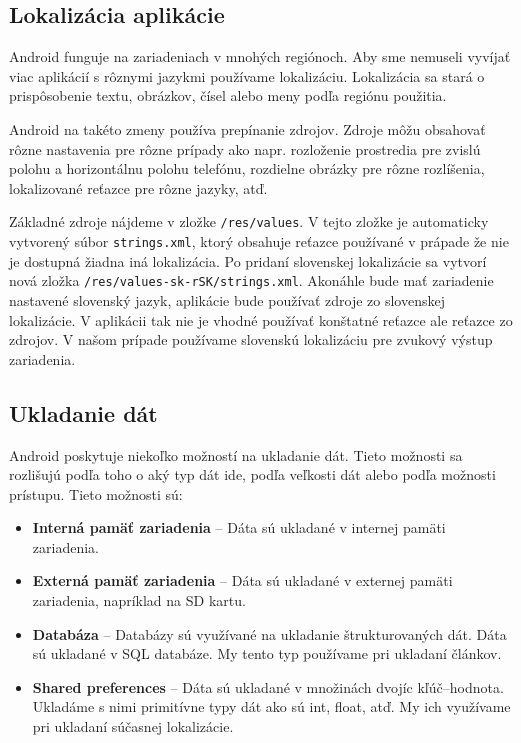 \documentclass{template/socthesis}
\begin{document}
\subsection*{Lokalizácia aplikácie}
Android funguje na zariadeniach v mnohých regiónoch. Aby sme nemuseli vyvíjať viac aplikácií s rôznymi jazykmi používame lokalizáciu. Lokalizácia sa stará o prispôsobenie textu, obrázkov, čísel alebo meny podľa regiónu použitia. 

Android na takéto zmeny používa prepínanie zdrojov. Zdroje môžu obsahovať rôzne nastavenia pre rôzne prípady ako napr. rozloženie prostredia pre zvislú polohu a horizontálnu polohu telefónu, rozdielne obrázky pre rôzne rozlíšenia, lokalizované reťazce pre rôzne jazyky, atď.

Základné zdroje nájdeme v zložke \texttt{/res/values}. V tejto zložke je automaticky vytvorený súbor \texttt{strings.xml}, ktorý obsahuje reťazce používané v prápade že nie je dostupná žiadna iná lokalizácia. Po pridaní slovenskej lokalizácie sa vytvorí nová zložka \texttt{/res/values-sk-rSK/strings.xml}. Akonáhle bude mať zariadenie nastavené slovenský jazyk, aplikácie bude používať zdroje zo slovenskej lokalizácie. V aplikácii tak nie je vhodné používať konštatné reťazce ale reťazce zo zdrojov. V našom prípade používame slovenskú lokalizáciu pre zvukový výstup zariadenia.

\subsection*{Ukladanie dát}
Android poskytuje niekoľko možností na ukladanie dát. Tieto možnosti sa rozlišujú podľa toho o aký typ dát ide, podľa veľkosti dát alebo podľa možnosti prístupu. Tieto možnosti sú\cite{persistence}:
\begin{itemize}
	\item \textbf{Interná pamäť zariadenia} -- Dáta sú ukladané v internej pamäti zariadenia.
	\item \textbf{Externá pamäť zariadenia} -- Dáta sú ukladané v externej pamäti zariadenia, napríklad na SD kartu.
	\item \textbf{Databáza} -- Databázy sú využívané na ukladanie štrukturovaných dát. Dáta sú ukladané v SQL databáze. My tento typ používame pri ukladaní článkov.
	\item \textbf{Shared preferences} -- Dáta sú ukladané v množinách dvojíc kľúč–hodnota. Ukladáme s nimi primitívne typy dát ako sú int, float, atď. My ich využívame pri ukladaní súčasnej lokalizácie.
\end{itemize}
\end{document}
